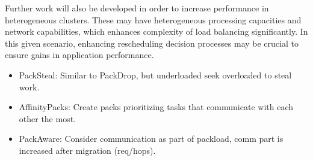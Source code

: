 Further work will also be developed in order to increase performance in heterogeneous clusters.
These may have heterogeneous processing capacities and network capabilities, which enhances complexity of load balancing significantly.
In this given scenario, enhancing rescheduling decision processes may be crucial to ensure gains in application performance.

\begin{itemize}
	\item PackSteal: Similar to PackDrop, but underloaded seek overloaded to steal work.
	\item AffinityPacks: Create packs prioritizing tasks that communicate with each other the most.
	\item PackAware: Consider communication as part of packload, comm part is increased after migration (req/hops).
\end{itemize}